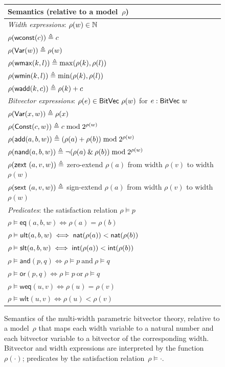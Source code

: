 \begin{figure}[htbp]
\centering
\small
\setlength{\tabcolsep}{3pt}
\renewcommand{\arraystretch}{1.2}
\begin{tabular}{@{}p{12.5cm}@{}}
\toprule
\textbf{Semantics} (relative to a model~$\rho$) \\
\midrule
\textit{Width expressions}: $\rho(w) \in \mathbb N$ \\[2pt]
\rowcolor{black!10!white}
$\rho(\mathsf{wconst}(c)) \triangleq c$ \\
$\rho(\mathsf{Var}(w)) \triangleq \rho(w)$ \\
\rowcolor{black!10!white}
$\rho(\mathsf{wmax}(k, l)) \triangleq \max(\rho(k), \rho(l))$ \\
$\rho(\mathsf{wmin}(k, l)) \triangleq \min(\rho(k), \rho(l))$ \\
\rowcolor{black!10!white}
$\rho(\mathsf{wadd}(k, c)) \triangleq \rho(k) + c$ \\[4pt]
\midrule
\textit{Bitvector expressions}: $\rho(e) \in \mathsf{BitVec}~{\rho(w)}$ for $e : \mathsf{BitVec}~{w}$ \\[2pt]
\rowcolor{black!10!white}
$\rho(\mathsf{Var}(x, w)) \triangleq \rho(x)$ \\
$\rho(\mathsf{Const}(c, w)) \triangleq c \bmod 2^{\rho(w)}$ \\
\rowcolor{black!10!white}
$\rho(\mathsf{add}(a, b, w)) \triangleq (\rho(a) + \rho(b)) \bmod 2^{\rho(w)}$ \\
$\rho(\mathsf{nand}(a, b, w)) \triangleq \lnot(\rho(a) \mathbin{\&} \rho(b)) \bmod 2^{\rho(w)}$ \\
\rowcolor{black!10!white}
$\rho(\mathsf{zext}~(a, v, w)) \triangleq$ zero-extend $\rho(a)$ from width $\rho(v)$ to width $\rho(w)$ \\
$\rho(\mathsf{sext}~(a, v, w)) \triangleq$ sign-extend $\rho(a)$ from width $\rho(v)$ to width $\rho(w)$ \\[4pt]
\midrule
\textit{Predicates}: the satisfaction relation $\rho \vDash p$ \\[2pt]
\rowcolor{black!10!white}
$\rho \vDash \mathsf{eq}(a, b, w) \iff \rho(a) = \rho(b)$ \\
$\rho \vDash \mathsf{ult}(a, b, w) \iff \textsf{nat}(\rho(a)) < \textsf{nat}(\rho(b))$ \\
\rowcolor{black!10!white}
$\rho \vDash \mathsf{slt}(a, b, w) \iff \textsf{int}(\rho(a)) < \textsf{int}(\rho(b))$ \\
$\rho \vDash \mathsf{and}(p, q) \iff \rho \vDash p \ \text{and}\ \rho \vDash q$ \\
\rowcolor{black!10!white}
$\rho \vDash \mathsf{or}(p, q) \iff \rho \vDash p \ \text{or}\ \rho \vDash q$ \\
$\rho \vDash \mathsf{weq}(u, v) \iff \rho(u) = \rho(v)$ \\
\rowcolor{black!10!white}
$\rho \vDash \mathsf{wlt}(u, v) \iff \rho(u) < \rho(v)$ \\
\bottomrule
\end{tabular}
\caption{Semantics of the multi-width parametric bitvector theory, relative to a
model~$\rho$ that maps each width variable to a natural number and each bitvector
variable to a bitvector of the corresponding width. Bitvector and width
expressions are interpreted by the function~$\rho(\cdot)$; predicates by the
satisfaction relation~$\rho \vDash \cdot$.}
\label{mwbv:fig:semantics}
\end{figure}

